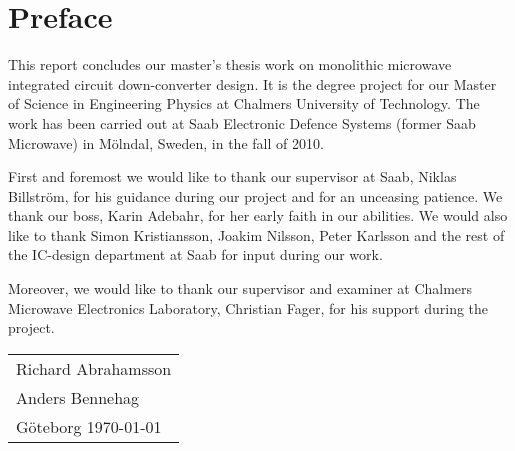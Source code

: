 \newpage
\clearpage
\section*{Preface}
	This report concludes our master's thesis work on monolithic microwave integrated circuit down-converter design. It is the degree project for our Master of Science in Engineering Physics at Chalmers University of Technology. The work has been carried out at Saab Electronic Defence Systems (former Saab Microwave) in Mölndal, Sweden, in the fall of 2010.
	
	First and foremost we would like to thank our supervisor at Saab, Niklas Billström, for his guidance during our project and for an unceasing patience. We thank our boss, Karin Adebahr, for her early faith in our abilities. We would also like to thank Simon Kristiansson, Joakim Nilsson, Peter Karlsson and the rest of the IC-design department at Saab for input during our work.
	
	Moreover, we would like to thank our supervisor and examiner at Chalmers Microwave Electronics Laboratory, Christian Fager, for his support during the project.\\[1cm]

\hfill
\begin{tabular}{ l }
Richard Abrahamsson \\
Anders Bennehag \\
Göteborg \today
\end{tabular}
